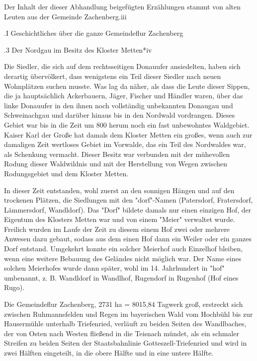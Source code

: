 Der Inhalt der dieser Abhandlung beigefügten Erzählungen stammt von alten Leuten
aus der Gemeinde Zachenberg.iii

.I Geschichtliches über die ganze Gemeindeflur Zachenberg

.3 Der Nordgau im Besitz des Kloster Metten*iv

Die Siedler, die sich auf dem rechtsseitigen Donauufer ansiedelten, haben sich
derartig übervölkert, dass wenigstens ein Teil dieser Siedler nach neuen
Wohnplätzen suchen musste. Was lag da näher, als dass die Leute dieser Sippen,
die ja hauptsächlich Ackerbauern, Jäger, Fischer und Händler waren, über das
linke Donauufer in den ihnen noch vollständig unbekannten Donaugau und
Schweinachgau und darüber hinaus bis in den Nordwald vordrangen. Dieses Gebiet
war bis in die Zeit um 800 herum noch ein fast unbewohntes Waldgebiet. Kaiser
Karl der Große hat damals dem Kloster Metten ein großes, wenn auch zur damaligen
Zeit wertloses Gebiet im Vorwalde, das ein Teil des Nordwaldes war, als
Schenkung vermacht. Dieser Besitz war verbunden mit der mühevollen Rodung dieser
Waldwildnis und mit der Herstellung von Wegen zwischen Rodungsgebiet und dem
Kloster Metten.

In dieser Zeit entstanden, wohl zuerst an den sonnigen Hängen und auf den
trockenen Plätzen, die Siedlungen mit den "dorf"-Namen (Patersdorf, Fratersdorf,
Lämmersdorf, Wandldorf). Das "Dorf" bildete damals nur einen einzigen Hof, der
Eigentum des Klosters Metten war und von einem "Meier" verwaltet wurde. Freilich
wurden im Laufe der Zeit zu diesem einem Hof zwei oder mehrere Anwesen dazu
gebaut, sodass aus dem einen Hof dann ein Weiler oder ein ganzes Dorf entstand.
Umgekehrt konnte ein solcher Meierhof auch Einzelhof bleiben, wenn eine weitere
Bebauung des Geländes nicht möglich war. Der Name eines solchen Meierhofes wurde
dann später, wohl im 14. Jahrhundert in "hof" umbenannt, z. B. Wandldorf in
Wandlhof, Rugendorf in Rugenhof (Hof eines Rugo).

Die Gemeindeflur Zachenberg, 2731 ha = 8015,84 Tagwerk groß, erstreckt sich
zwischen Ruhmannsfelden und Regen im bayerischen Wald vom Hochbühl bis zur
Hausermühle unterhalb Triefenried, verläuft zu beiden Seiten des Wandlbaches,
der von Osten nach Westen fließend in die Teisnach mündet, als ein schmaler
Streifen zu beiden Seiten der Staatsbahnlinie Gotteszell-Triefenried und wird in
zwei Hälften eingeteilt, in die obere Hälfte und in eine untere Hälfte.

